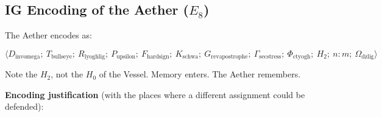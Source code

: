 \documentclass[12pt,a4paper]{article}
\begin{document}
\subsection{IG Encoding of the Aether ($E_8$)}

The Aether encodes as:

\[\langle D_{\text{invomega}};\ T_{\text{bullseye}};\ R_{\text{lyoghlig}};\ P_{\text{upsilon}};\ F_{\text{hardsign}};\ K_{\text{schwa}};\ G_{\text{revapostrophe}};\ \Gamma_{\text{secstress}};\ \Phi_{\text{ctyogh}};\ H_2;\ n{:}m;\ \Omega_{\text{dzlig}} \rangle\]

Note the $H_2$, not the $H_0$ of the Vessel. Memory enters. The Aether remembers.

\textbf{Encoding justification} (with the places where a different assignment could be defended):
\end{document}
